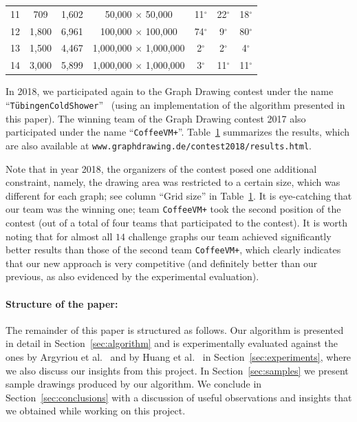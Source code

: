 \documentclass{comjnl}
\newcommand{\myparagraph}[1]{\medskip\noindent\textbf{#1}.}
\begin{document}
\begin{table}
\begin{adjustbox}{width=1\textwidth}
\begin{tabular}{c|c|c|c|c|c|c}
\rowcolor{gray!30!} 11 & 709   & 1,602 & 50,000 $\times$ 50,000       & 11$^\circ$ & 22$^\circ$ & 18$^\circ$\\
\rowcolor{gray!00!} 12 & 1,800 & 6,961 & 100,000 $\times$ 100,000     & 74$^\circ$ &  9$^\circ$ & 80$^\circ$\\
\rowcolor{gray!30!} 13 & 1,500 & 4,467 & 1,000,000 $\times$ 1,000,000 &  2$^\circ$ &  2$^\circ$ & 4$^\circ$\\
\rowcolor{gray!00!} 14 & 3,000 & 5,899 & 1,000,000 $\times$ 1,000,000 &  3$^\circ$ & 11$^\circ$ & 11$^\circ$\\
\bottomrule
\end{tabular}
\end{adjustbox}
\label{tab:gdContest2018}
\end{table}

In 2018, we participated again to the Graph Drawing contest under the name ``\texttt{T\"ubingenColdShower}''~\cite{DBLP:conf/gd/DevannyKLR18} (using an implementation of the algorithm presented in this paper). The winning team of the Graph Drawing contest 2017 also participated under the name ``\texttt{CoffeeVM+}''. Table~\ref{tab:gdContest2018} summarizes the results, which are also available at \texttt{www.graphdrawing.de/contest2018/results.html}. 

Note that in year 2018, the organizers of the contest posed one additional constraint, namely, the drawing area was restricted to a certain size, which was different for each graph; see column ``Grid size'' in Table~\ref{tab:gdContest2018}. It is eye-catching that our team was the winning one; team \texttt{CoffeeVM+} took the second position of the contest (out of a total of four teams that participated to the contest). It is worth noting that for almost all $14$ challenge graphs our team achieved significantly better results than those of the second team \texttt{CoffeeVM+}, which clearly indicates that our new approach is very competitive (and definitely better than our previous,  as also evidenced by the experimental evaluation).

\paragraph{Structure of the paper:}
The remainder of this paper is structured as follows. 
Our algorithm is presented in detail in Section~\ref{sec:algorithm} and is experimentally evaluated against the ones by Argyriou et al.~\cite{DBLP:journals/cj/ArgyriouBS13} and by Huang et al.~\cite{DBLP:journals/vlc/HuangEHL13} in Section~\ref{sec:experiments}, where we also discuss our insights from this project. In Section~\ref{sec:samples} we present sample drawings produced by our algorithm. We conclude in Section~\ref{sec:conclusions} with a discussion of useful observations and insights that we obtained while working on this project.
\end{document}
